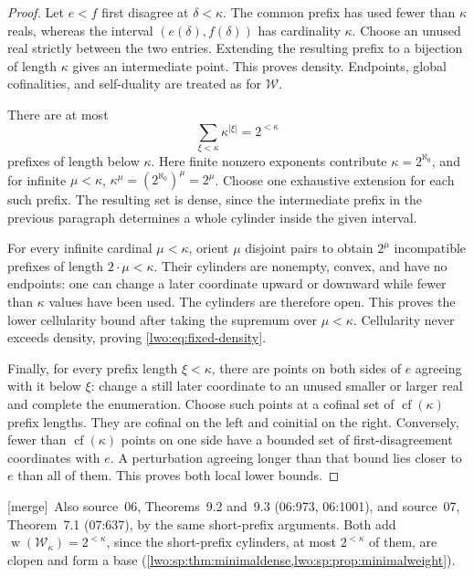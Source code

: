 \documentclass[11pt,a4paper]{article}
\newtheorem{proposition}[theorem]{Proposition}
\theoremstyle{definition}
\theoremstyle{remark}
\newcommand{\W}{\mathcal W}
\newcommand{\cf}{\operatorname{cf}}
\newcommand{\dens}{\operatorname{d}}
\newcommand{\cell}{\operatorname{cell}}
\newcommand{\weight}{\operatorname{w}}
\newcommand{\merge}{\textsf{[merge]}}
\begin{document}
\begin{proof}
Let $e<f$ first disagree at $\delta<\kappa$. The common prefix has used
fewer than $\kappa$ reals, whereas the interval
$(e(\delta),f(\delta))$ has cardinality $\kappa$. Choose an unused real
strictly between the two entries. Extending the resulting prefix to a
bijection of length $\kappa$ gives an intermediate point. This proves
density. Endpoints, global cofinalities, and self-duality are treated as for
$\W$.

There are at most
\[
       \sum_{\xi<\kappa}\kappa^{|\xi|}=2^{<\kappa}
\]
prefixes of length below $\kappa$. Here finite nonzero exponents contribute
$\kappa=2^{\aleph_0}$, and for infinite $\mu<\kappa$,
$\kappa^\mu=(2^{\aleph_0})^\mu=2^\mu$. Choose one exhaustive extension
for each such prefix. The resulting set is dense, since the intermediate
prefix in the previous paragraph determines a whole cylinder inside the
given interval.

For every infinite cardinal $\mu<\kappa$, orient $\mu$ disjoint pairs to
obtain $2^\mu$ incompatible prefixes of length $2\cdot\mu<\kappa$.
Their cylinders are nonempty, convex, and have no endpoints: one can change
a later coordinate upward or downward while fewer than $\kappa$ values have
been used. The cylinders are therefore open. This proves the lower
cellularity bound after taking the supremum over $\mu<\kappa$.
Cellularity never exceeds density, proving \eqref{lwo:eq:fixed-density}.

Finally, for every prefix length $\xi<\kappa$, there are points on both
sides of $e$ agreeing with it below $\xi$: change a still later coordinate
to an unused smaller or larger real and complete the enumeration. Choose
such points at a cofinal set of $\cf(\kappa)$ prefix lengths. They are
cofinal on the left and coinitial on the right. Conversely, fewer than
$\cf(\kappa)$ points on one side have a bounded set of first-disagreement
coordinates with $e$. A perturbation agreeing longer than that bound lies
closer to $e$ than all of them. This proves both local lower bounds.
\end{proof}
\merge\ Also source~06, Theorems~9.2 and~9.3 (06:973, 06:1001), and
source~07, Theorem~7.1 (07:637), by the same short-prefix arguments. Both add
$\weight(\W_\kappa)=2^{<\kappa}$, since the short-prefix cylinders, at most
$2^{<\kappa}$ of them, are clopen and form a base
(\cref{lwo:sp:thm:minimaldense,lwo:sp:prop:minimalweight}).
\end{document}
